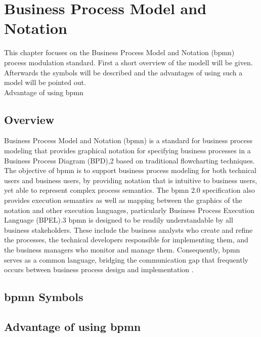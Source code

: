 \chapter{Business Process Model and Notation}
\label{cha:BPMN}
This chapter focuses on the Business Process Model and Notation (\gls{bpmn}) process modulation standard. First a short overview of the modell will be given. Afterwards the symbols will be described and the advantages of using such a model will be pointed out.\\
Advantage of using \gls{bpmn}

\section{Overview}
\label{sec:BPMNOverview}


Business Process Model and Notation (\gls{bpmn}) is a standard for business process
modeling that provides graphical notation for specifying business processes in a
Business Process Diagram (BPD),2 based on traditional flowcharting techniques.
The objective of \gls{bpmn} is to support business process modeling for both technical
users and business users, by providing notation that is intuitive to business users, yet
able to represent complex process semantics. The \gls{bpmn} 2.0 specification also provides execution semantics as well as mapping between the graphics of the notation
and other execution languages, particularly Business Process Execution Language
(BPEL).3
\gls{bpmn} is designed to be readily understandable by all business stakeholders.
These include the business analysts who create and refine the processes, the technical developers responsible for implementing them, and the business managers who
monitor and manage them. Consequently, \gls{bpmn} serves as a common language,
bridging the communication gap that frequently occurs between business process
design and implementation \cite{Rosing.2015b}.

\section{\gls{bpmn} Symbols}
\label{sec:BPMNSymbols}

\section{Advantage of using \gls{bpmn}}
\label{sec:BPMNGoal}